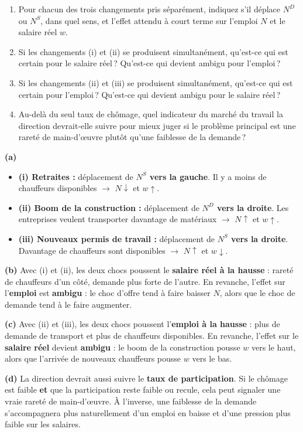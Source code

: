 \begin{enumerate}[label=(\alph*)]
   \item Pour chacun des trois changements pris séparément, indiquez s'il déplace $N^D$ ou $N^S$, dans quel sens, et l'effet attendu à court terme sur l'emploi $N$ et le salaire réel $w$.
   \item Si les changements (i) et (ii) se produisent simultanément, qu'est-ce qui est certain pour le salaire réel\,? Qu'est-ce qui devient ambigu pour l'emploi\,?
   \item Si les changements (ii) et (iii) se produisent simultanément, qu'est-ce qui est certain pour l'emploi\,? Qu'est-ce qui devient ambigu pour le salaire réel\,?
   \item Au-delà du seul taux de chômage, quel indicateur du marché du travail la direction devrait-elle suivre pour mieux juger si le problème principal est une rareté de main-d'{\oe}uvre plutôt qu'une faiblesse de la demande\,?
\end{enumerate}

\begin{reponse}
\textbf{(a)}
\begin{itemize}
   \item \textbf{(i) Retraites :} déplacement de \textbf{$N^S$ vers la gauche}. Il y a moins de chauffeurs disponibles $\to$ $N \downarrow$ et $w \uparrow$.
   \item \textbf{(ii) Boom de la construction :} déplacement de \textbf{$N^D$ vers la droite}. Les entreprises veulent transporter davantage de matériaux $\to$ $N \uparrow$ et $w \uparrow$.
   \item \textbf{(iii) Nouveaux permis de travail :} déplacement de \textbf{$N^S$ vers la droite}. Davantage de chauffeurs sont disponibles $\to$ $N \uparrow$ et $w \downarrow$.
\end{itemize}

\textbf{(b)} Avec (i) et (ii), les deux chocs poussent le \textbf{salaire réel à la hausse} : rareté de chauffeurs d'un côté, demande plus forte de l'autre. En revanche, l'effet sur l'\textbf{emploi} est \textbf{ambigu} : le choc d'offre tend à faire baisser $N$, alors que le choc de demande tend à le faire augmenter.

\textbf{(c)} Avec (ii) et (iii), les deux chocs poussent l'\textbf{emploi à la hausse} : plus de demande de transport et plus de chauffeurs disponibles. En revanche, l'effet sur le \textbf{salaire réel} devient \textbf{ambigu} : le boom de la construction pousse $w$ vers le haut, alors que l'arrivée de nouveaux chauffeurs pousse $w$ vers le bas.

\textbf{(d)} La direction devrait aussi suivre le \textbf{taux de participation}. Si le chômage est faible \textbf{et} que la participation reste faible ou recule, cela peut signaler une vraie rareté de main-d'{\oe}uvre. À l'inverse, une faiblesse de la demande s'accompagnera plus naturellement d'un emploi en baisse et d'une pression plus faible sur les salaires.
\end{reponse}

